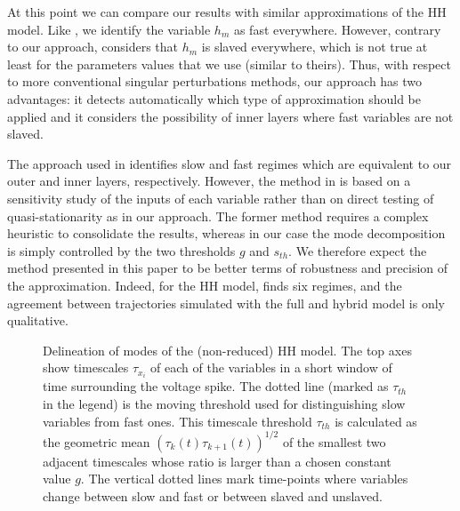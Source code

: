 \documentclass{llncs}
\begin{document}
 {At this point we can compare our results with similar approximations of the
HH model. Like \cite{suckley2003asymptotic}, we identify the variable
$h_m$ as fast everywhere. However, contrary to our approach,
\cite{suckley2003asymptotic} considers that $h_m$ is slaved everywhere, which is not
true at least for the parameters values that we use (similar to theirs).  Thus,
with respect to more conventional singular perturbations methods,
our approach has two advantages:
it detects automatically which type of approximation should be applied  and
it considers the possibility of inner layers where fast variables are not slaved.

The approach used in \cite{clewley2004dominant,clewley2005computational} identifies slow and
fast regimes which are equivalent to our outer and inner layers, respectively.
However, the method in \cite{clewley2004dominant,clewley2005computational}  is based on a sensitivity study
of the inputs of each variable rather than on direct testing of quasi-stationarity as in our
approach. The former method requires a complex heuristic to consolidate the results, whereas in our case
the mode decomposition is simply controlled by the two thresholds $g$ and $s_{th}$.
 We therefore expect the method presented in this paper to be better
terms of robustness and precision of the approximation. Indeed, for the HH model,
\cite{clewley2005computational} finds six regimes, and the agreement between trajectories
simulated with the full and hybrid model is only qualitative. }




    \def\thisfigxmin{\spikewindowstart}
    \def\thisfigxmax{\spikewindowend}
    \def\plotheight{\textwidth/4}
    \begin{figure}[h!] \centering
        
		\caption{Delineation of modes of the (non-reduced) HH
			model.  The top axes show timescales $\tau_{x_i}$ of each of the
			variables in a short window of time surrounding the voltage spike.
			The dotted line (marked as $\tau_{th}$ in the legend) is the moving
			threshold used for distinguishing slow variables from fast ones.
			This timescale threshold $\tau_{th}$ is calculated as the geometric
			mean $(\tau_{k}(t)\tau_{k+1}(t))^{1/2}$ of the smallest two
			adjacent timescales whose ratio is larger than a chosen constant
			value $g$.  The vertical dotted lines mark time-points where
			variables change between slow and fast or between slaved and
			unslaved.
        }\label{HH-fig-slowness}
    \end{figure}
\end{document}
